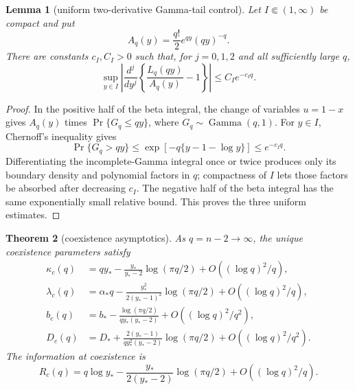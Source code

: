 \documentclass[11pt,a4paper]{article}
\newtheorem{theorem}{Theorem}[section]
\newtheorem{lemma}[theorem]{Lemma}
\begin{document}
\begin{lemma}[uniform two-derivative Gamma-tail control]
\label{lem:gamma-tail}
Let $I\Subset(1,\infty)$ be compact and put
\[
 A_q(y)=\frac{q!}{2}e^{qy}(qy)^{-q}.
\]
There are constants $c_I,C_I>0$ such that, for $j=0,1,2$ and all sufficiently
large $q$,
\[
 \sup_{y\in I}
 \left|\frac{d^j}{dy^j}\left\{\frac{L_q(qy)}{A_q(y)}-1\right\}\right|
 \le C_Ie^{-c_Iq}.
\]
\end{lemma}

\begin{proof}
In the positive half of the beta integral, the change of variables $u=1-x$
gives $A_q(y)$ times
$\Pr\{G_q\le qy\}$, where $G_q\sim\operatorname{Gamma}(q,1)$.
For $y\in I$, Chernoff's inequality gives
\[
 \Pr\{G_q>qy\}\le
 \exp[-q\{y-1-\log y\}]\le e^{-c_Iq}.
\]
Differentiating the incomplete-Gamma integral once or twice produces only its
boundary density and polynomial factors in $q$; compactness of $I$ lets those
factors be absorbed after decreasing $c_I$.  The negative half of the beta
integral has the same exponentially small relative bound.  This proves the
three uniform estimates.
\end{proof}

\begin{theorem}[coexistence asymptotics]\label{thm:thermodynamic}
As $q=n-2\to\infty$, the unique coexistence parameters satisfy
\begin{align}
 \kappa_c(q)
 &=qy_*-\frac{y_*}{y_*-2}\log(\pi q/2)
   +O((\log q)^2/q),\label{eq:kappashift}\\
 \lambda_c(q)
 &=\alpha_*q-\frac{y_*^2}{2(y_*-1)^2}\log(\pi q/2)
   +O((\log q)^2/q),\label{eq:lambdashift}\\
 b_c(q)
 &=b_*-\frac{\log(\pi q/2)}{q y_*(y_*-2)}
   +O((\log q)^2/q^2),\label{eq:bshift}\\
 D_c(q)
 &=D_*+\frac{2(y_*-1)}{q y_*^2(y_*-2)}\log(\pi q/2)
   +O((\log q)^2/q^2).\label{eq:Dshift}
\end{align}
The information at coexistence is
\begin{equation}\label{eq:Rshift}
 R_c(q)=q\log y_*-\frac{y_*}{2(y_*-2)}\log(\pi q/2)
 +O((\log q)^2/q).
\end{equation}
\end{theorem}
\end{document}
